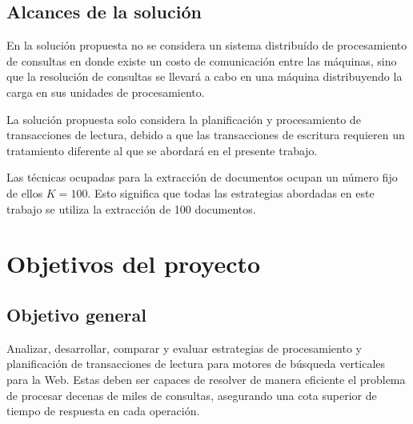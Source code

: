\subsection{Alcances de la solución}
\label{intro:alcancesdelasolucion}
En la solución propuesta no se considera un sistema distribuído de procesamiento de consultas en donde existe un costo de comunicación entre las máquinas, sino que la resolución de consultas se llevará a cabo en una máquina distribuyendo la carga en sus unidades de procesamiento.

La solución propuesta solo considera la planificación y procesamiento de transacciones de lectura, debido a que las transacciones de escritura requieren un tratamiento diferente al que se abordará en el presente trabajo.

Las técnicas ocupadas para la extracción de documentos ocupan un número fijo de ellos $K = 100$. Esto significa que todas las estrategias abordadas en este trabajo se utiliza la extracción de 100 documentos. 

\section{Objetivos del proyecto}
\label{intro:objetivosysolucion}

\subsection{Objetivo general}
\label{intro:objetivogeneral}
Analizar, desarrollar, comparar y evaluar estrategias de procesamiento y planificación de transacciones de lectura para motores de búsqueda verticales para la Web. Estas deben ser capaces de resolver de manera eficiente el problema de procesar decenas de miles de consultas, asegurando una cota superior de tiempo de respuesta en cada operación.


